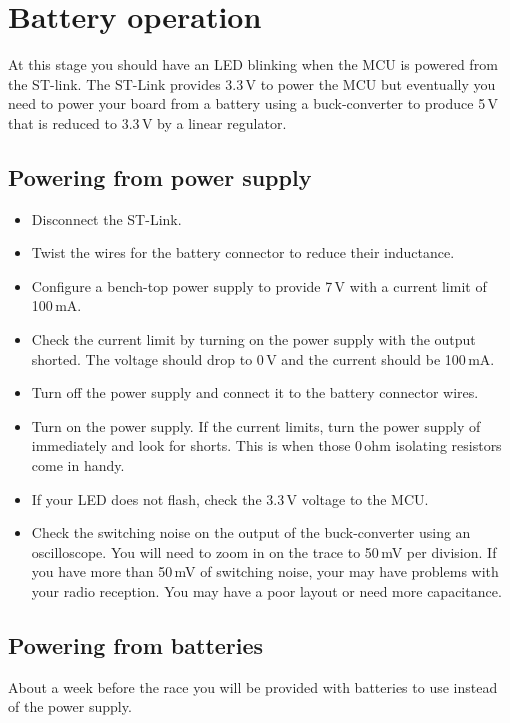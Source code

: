 \chapter{Battery operation}
\label{battery-operation}

At this stage you should have an LED blinking when the MCU is powered
from the ST-link.  The ST-Link provides 3.3\,V to power the MCU but
eventually you need to power your board from a battery using a
buck-converter to produce 5\,V that is reduced to 3.3\,V by a linear
regulator.


\section{Powering from power supply}

\begin{itemize}
\item Disconnect the ST-Link.

\item Twist the wires for the battery connector to reduce their
  inductance.

\item Configure a bench-top power supply to provide 7\,V with a
  current limit of 100\,mA.

\item Check the current limit by turning on the power supply with the
  output shorted.  The voltage should drop to 0\,V and the current
  should be 100\,mA.

\item Turn off the power supply and connect it to the battery
  connector wires.

\item Turn on the power supply.  If the current limits, turn the power
  supply of immediately and look for shorts.  This is when those
  0\,ohm isolating resistors come in handy.

\item If your LED does not flash, check the 3.3\,V voltage to the MCU.

\item Check the switching noise on the output of the buck-converter
  using an oscilloscope.  You will need to zoom in on the trace to
  50\,mV per division.  If you have more than 50\,mV of switching
  noise, your may have problems with your radio reception.  You may
  have a poor layout or need more capacitance.

\end{itemize}


\section{Powering from batteries}

About a week before the race you will be provided with batteries to
use instead of the power supply.
